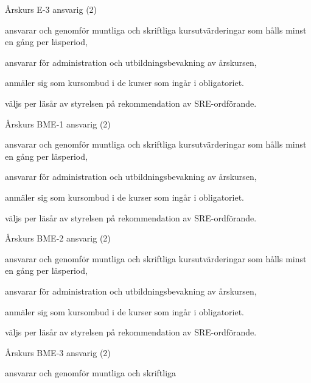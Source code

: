 \documentclass[10pt]{article}
\begin{document}
\begin{emptylist}
\begin{dashlist}
        \end{dashlist}
    \item Årskurs E-3 ansvarig (2)
        \begin{dashlist}
            \item ansvarar och genomför muntliga och skriftliga
                kursutvärderingar som hålls minst en gång per läsperiod,
            \item ansvarar för administration och utbildningsbevakning av
                årskursen,
            \item anmäler sig som kursombud i de kurser som ingår i
                obligatoriet.
             \item väljs per läsår av styrelsen på rekommendation av SRE-ordförande.
        \end{dashlist}
    \item Årskurs BME-1 ansvarig (2)
        \begin{dashlist}
            \item ansvarar och genomför muntliga och skriftliga
                kursutvärderingar som hålls minst en gång per läsperiod,
            \item ansvarar för administration och utbildningsbevakning av
                årskursen,
            \item anmäler sig som kursombud i de kurser som ingår i
                obligatoriet.
              \item väljs per läsår av styrelsen på rekommendation av SRE-ordförande.
        \end{dashlist}
    \item Årskurs BME-2 ansvarig (2)
        \begin{dashlist}
            \item ansvarar och genomför muntliga och skriftliga
                kursutvärderingar som hålls minst en gång per läsperiod,
            \item ansvarar för administration och utbildningsbevakning av
                årskursen,
            \item anmäler sig som kursombud i de kurser som ingår i
                obligatoriet.
             \item väljs per läsår av styrelsen på rekommendation av SRE-ordförande.
        \end{dashlist}
    \item Årskurs BME-3 ansvarig (2)
        \begin{dashlist}
            \item ansvarar och genomför muntliga och skriftliga

\end{dashlist}
\end{emptylist}
\end{document}
